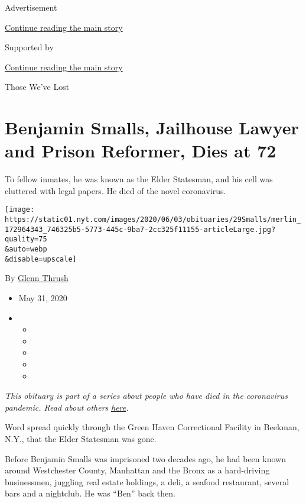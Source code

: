 Advertisement

\protect\hyperlink{after-top}{Continue reading the main story}

Supported by

\protect\hyperlink{after-sponsor}{Continue reading the main story}

Those We've Lost

\hypertarget{benjamin-smalls-jailhouse-lawyer-and-prison-reformer-dies-at-72}{%
\section{Benjamin Smalls, Jailhouse Lawyer and Prison Reformer, Dies at
72}\label{benjamin-smalls-jailhouse-lawyer-and-prison-reformer-dies-at-72}}

To fellow inmates, he was known as the Elder Statesman, and his cell was
cluttered with legal papers. He died of the novel coronavirus.

\texttt{[image: https://static01.nyt.com/images/2020/06/03/obituaries/29Smalls/merlin\_172964343\_746325b5-5773-445c-9ba7-2cc325f11155-articleLarge.jpg?quality=75\\\&auto=webp\\\&disable=upscale]}

By \href{https://www.nytimes.com/by/glenn-thrush}{Glenn Thrush}

\begin{itemize}
\item
  May 31, 2020
\item
  \begin{itemize}
  \item
  \item
  \item
  \item
  \item
  \end{itemize}
\end{itemize}

\emph{This obituary is part of a series about people who have died in
the coronavirus pandemic. Read about others}
\href{https://www.nytimes.com/series/people-who-have-died-of-the-coronavirus}{\emph{here}}\emph{.}

Word spread quickly through the Green Haven Correctional Facility in
Beekman, N.Y., that the Elder Statesman was gone.

Before Benjamin Smalls was imprisoned two decades ago, he had been known
around Westchester County, Manhattan and the Bronx as a hard-driving
businessmen, juggling real estate holdings, a deli, a seafood
restaurant, several bars and a nightclub. He was ``Ben'' back then.

